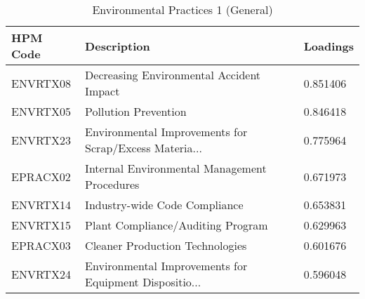 \begin{table}[htbp]
\centering
\caption{Environmental Practices 1 (General)}
\label{tab:your_label}
\begin{tabular}{lll}
\toprule
HPM Code & Description & Loadings \\
\midrule
ENVRTX08 & Decreasing Environmental Accident Impact & 0.851406 \\
ENVRTX05 & Pollution Prevention & 0.846418 \\
ENVRTX23 & Environmental Improvements for Scrap/Excess Materia... & 0.775964 \\
EPRACX02 & Internal Environmental Management Procedures & 0.671973 \\
ENVRTX14 & Industry-wide Code Compliance & 0.653831 \\
ENVRTX15 & Plant Compliance/Auditing Program & 0.629963 \\
EPRACX03 & Cleaner Production Technologies & 0.601676 \\
ENVRTX24 & Environmental Improvements for Equipment Dispositio... & 0.596048 \\
\bottomrule
\end{tabular}
\end{table}